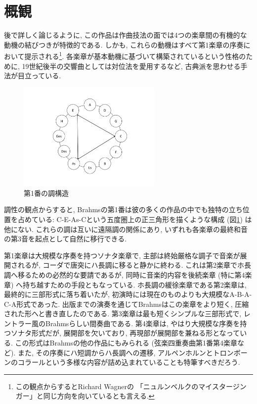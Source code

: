 
\section{概観}

後で詳しく論じるように, この作品は作曲技法の面では4つの楽章間の有機的な動機の結びつきが特徴的である.
しかも, これらの動機はすべて第1楽章の序奏において提示される\footnote{この観点からするとRichard Wagnerの
「ニュルンベルクのマイスタージンガー」と同じ方向を向いているとも言える.}.
各楽章が基本動機に基づいて構築されているという性格のために, 19世紀後半の交響曲としては対位法を愛用するなど, 古典派を思わせる手法が目立っている.
\begin{figure}
	\centering
	\includegraphics[clip,width=7.0cm]{./figure/modulatory.pdf}
	\caption{第1番の調構造}
	\label{modulatory}
\end{figure}
調性の観点からすると, Brahmsの第1番は彼の多くの作品の中でも独特の立ち位置を占めている:
C-E-As-Cという五度圏上の正三角形を描くような構成 (図\ref{modulatory}) は他にない.
これらの調は互いに遠隔調の関係にあり, いずれも各楽章の最終和音の第3音を起点として自然に移行できる.

第1楽章は大規模な序奏を持つソナタ楽章で, 主部は終始厳格な調子で音楽が展開されるが, コーダで唐突にハ長調に移ると静かに終わる.
これは第2楽章でホ長調へ移るための必然的な要請であるが, 同時に音楽的内容を後続楽章 (特に第4楽章) へ持ち越すための手段ともなっている.
ホ長調の緩徐楽章である第2楽章は, 最終的に三部形式に落ち着いたが, 初演時には現在のものよりも大規模なA-B-A-C-A形式であった.
出版までの演奏を通じてBrahmsはこの楽章をより短く, 圧縮された形へと書き直したのである.
第3楽章は最も短くシンプルな三部形式で, レントラー風のBrahmsらしい間奏曲である.
第4楽章は, やはり大規模な序奏を持つソナタ形式だが, 展開部を欠いており, 再現部が展開部を兼ねる形となっている.
この形式はBrahmsの他の作品にもみられる (弦楽四重奏曲第1番第4楽章など).
また, その序奏にハ短調からハ長調への遷移, アルペンホルンとトロンボーンのコラールという多様な内容が詰め込まれていることも特筆すべきだろう.

